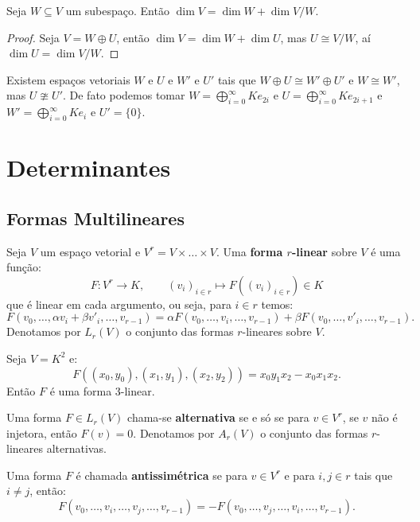 \documentclass[11pt,twoside,a4paper]{book}
\begin{document}
\begin{corolario}
Seja $W\subseteq V$ um subespaço. Então $\dim V=\dim W+\dim V/W$.
\end{corolario}
\begin{proof}
Seja $V=W\oplus U$, então $\dim V=\dim W+\dim U$, mas $U\cong V/W$, aí $\dim U=\dim V/W$.
\end{proof}

\begin{observacao}
Existem espaços vetoriais $W$ e $U$ e $W'$ e $U'$ tais que $W\oplus U\cong W'\oplus U'$ e $W\cong W'$, mas $U\ncong U'$. De fato podemos tomar $W=\bigoplus_{i=0}^\infty Ke_{2i}$ e $U=\bigoplus_{i=0}^\infty Ke_{2i+1}$ e $W'=\bigoplus_{i=0}^\infty Ke_i$ e $U'=\{0\}$.
\end{observacao}

\chapter{Determinantes}

\section{Formas Multilineares}

\begin{definicao}
Seja $V$ um espaço vetorial e $V^r=V\times\dots\times V$. Uma \textbf{forma $r$-linear} sobre $V$ é uma função:
\[
F:V^r\rightarrow K,\quad\quad (v_i)_{i\in r}\mapsto F((v_i)_{i\in r})\in K
\]
que é linear em cada argumento, ou seja, para $i\in r$ temos:
\[
F(v_0,\dots,\alpha v_i+\beta v'_i,\dots,v_{r-1})=\alpha F(v_0,\dots,v_i,\dots,v_{r-1})+\beta F(v_0,\dots,v'_i,\dots,v_{r-1}).
\]
Denotamos por $L_r(V)$ o conjunto das formas $r$-lineares sobre $V$.
\end{definicao}

\begin{exemplo}
Seja $V=K^2$ e:
\[
F((x_0,y_0),(x_1,y_1),(x_2,y_2))=x_0y_1x_2-x_0x_1x_2.
\]
Então $F$ é uma forma 3-linear.
\end{exemplo}

\begin{definicao}
Uma forma $F\in L_r(V)$ chama-se \textbf{alternativa} se e só se para $v\in V^r$, se $v$ não é injetora, então $F(v)=0$. Denotamos por $A_r(V)$ o conjunto das formas $r$-lineares alternativas.
\end{definicao}

\begin{definicao}
Uma forma $F$ é chamada \textbf{antissimétrica} se para $v\in V^r$ e para $i,j\in r$ tais que $i\neq j$, então:
\[
F(v_0,\dots,v_i,\dots,v_j,\dots,v_{r-1})=-F(v_0,\dots,v_j,\dots,v_i,\dots,v_{r-1}).
\]
\end{definicao}
\end{document}
